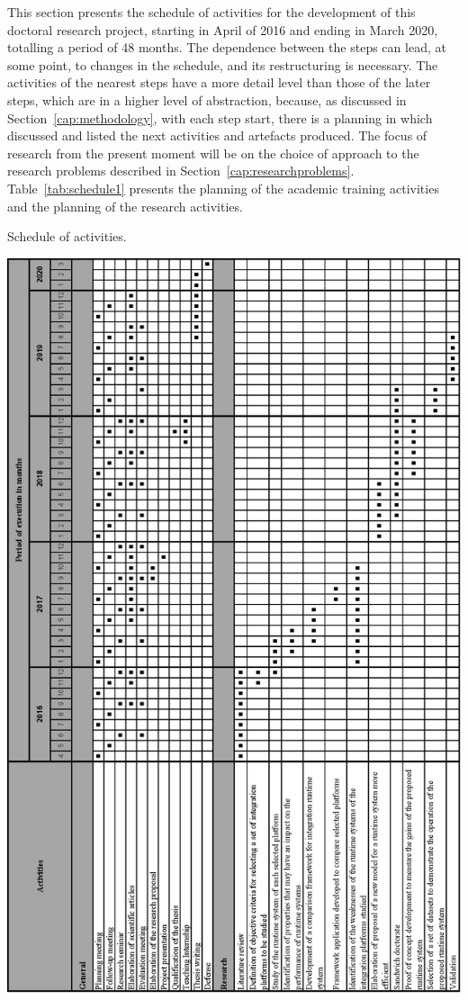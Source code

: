 \label{cap:schedule}
\noindent 

This section presents the schedule of activities for the development of this doctoral research project, starting in April of 2016 and ending in March 2020, totalling a period of 48 months. The dependence between the steps can lead, at some point, to changes in the schedule, and its restructuring is necessary. The activities of the nearest steps have a more detail level than those of the later steps, which are in a higher level of abstraction, because, as discussed in Section~\ref{cap:methodology}, with each step start, there is a planning in which discussed and listed the next activities and artefacts produced.
The focus of research from the present moment will be on the choice of approach to the research problems described in  Section~\ref{cap:researchproblems}.
Table~\ref{tab:schedule1} presents the planning of the academic training activities and the planning of the research activities.

\begin{table}[htbp]
	\centering
	\caption{Schedule of activities.}
    \includegraphics[scale=0.90]{./figs/schedule.eps}
	\label{tab:schedule1}
\end{table}

